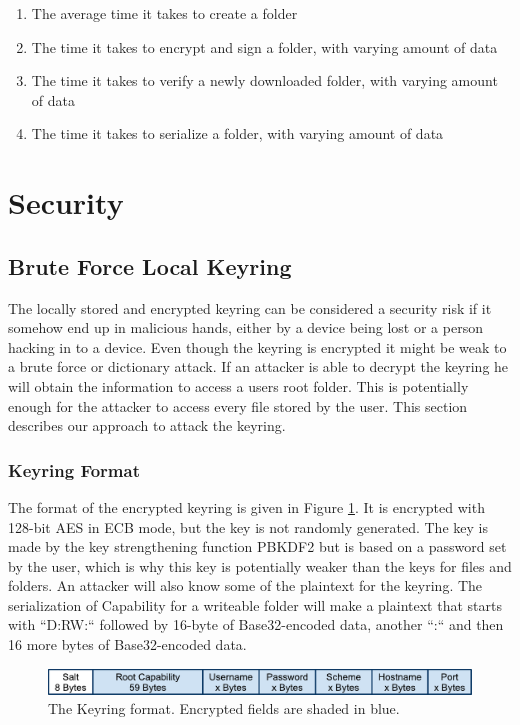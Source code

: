 \documentclass[pdftex,english,10pt,b5paper,twoside]{book}
\begin{document}
\begin{enumerate}
    \item The average time it takes to create a folder
    \item The time it takes to encrypt and sign a folder, with varying amount
    of data
    \item The time it takes to verify a newly downloaded folder, with varying
    amount of data
    \item The time it takes to serialize a folder, with varying amount of data
\end{enumerate}

\section{Security}

\subsection{Brute Force Local Keyring} \label{sec:BFLK} The locally stored and
encrypted keyring can be considered a security risk if it somehow end up in
malicious hands, either by a device being lost or a person hacking in to a
device. Even though the keyring is encrypted it might be weak to a brute force
or dictionary attack. If an attacker is able to decrypt the keyring he will
obtain the information to access a users root folder. This is potentially
enough for the attacker to access every file stored by the user. This section
describes our approach to attack the keyring.

\subsubsection{Keyring Format} The format of the encrypted keyring is given in
Figure \ref{fig:KeyringFormat}.  It is encrypted with 128-bit \ac{AES} in
\ac{ECB} mode, but the key is not randomly generated.  The key is made by the
key strengthening function \ac{PBKDF2} but is based on a password set by the
user, which is why this key is potentially weaker than the keys for files and
folders. An attacker will also know some of the plaintext for the keyring. The
serialization of Capability for a writeable folder will make a plaintext that
starts with ``D:RW:`` followed by 16-byte of Base32-encoded data, another ``:``
and then 16 more bytes of Base32-encoded data. 

\begin{figure}[h!]
    \centering
    \includegraphics[scale=0.6]{KeyringFormat.pdf}
    \caption{The Keyring format. Encrypted fields are shaded in blue.}
    \label{fig:KeyringFormat}
\end{figure}
\end{document}
